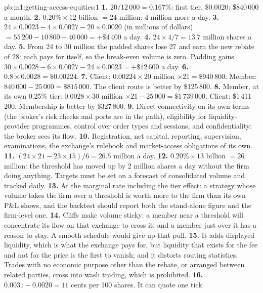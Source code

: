 \begin{solution}{pb:m1:getting-access-equities:1}
\textbf{1.} $20/12\,000 = 0.167\%$: first tier, \$0.0020: \$840\,000 a month.
\textbf{2.} $0.20\% \times 12$ billion $= 24$ million: 4 million more a day.
\textbf{3.} $24 \times 0.0023 - 4 \times 0.0027 - 20 \times 0.0020$ (in millions of
dollars) $= 55\,200 - 10\,800 - 40\,000 = +\$4\,400$ a day.
\textbf{4.} $24 \times 4/7 = 13.7$ million shares a day.
\textbf{5.} From 24 to 30 million the padded shares lose 27 and earn the new
rebate of 28: each pays for itself, so the break-even volume is zero.
Padding gains $30 \times 0.0028 - 6 \times 0.0027 - 24 \times 0.0023 = +\$12\,600$ a
day.
\textbf{6.} $0.8 \times 0.0028 = \$0.00224$.
\textbf{7.} Client: $0.00224 \times 20$ million $\times 21 = \$940\,800$. Member:
$840\,000 - 25\,000 = \$815\,000$. The client route is better by \$125\,800.
\textbf{8.} Member, at its own 0.25\% tier: $0.0028 \times 30$ million $\times 21 -
25\,000 = \$1\,739\,000$. Client: \$1\,411\,200. Membership is better by
\$327\,800.
\textbf{9.} Direct connectivity on its own terms (the broker's risk checks
and ports are in the path), eligibility for liquidity-provider programmes,
control over order types and sessions, and confidentiality: the broker sees
its flow.
\textbf{10.} Registration, net capital, reporting, supervision, examinations,
the exchange's rulebook and market-access obligations of its own.
\textbf{11.} $(24 \times 21 - 23 \times 15)/6 = 26.5$ million a day.
\textbf{12.} $0.20\% \times 13$ billion $= 26$ million: the threshold has moved
up by 2 million shares a day without the firm doing anything. Targets must
be set on a forecast of consolidated volume and tracked daily.
\textbf{13.} At the marginal rate including the tier effect: a strategy whose
volume takes the firm over a threshold is worth more to the firm than its own
P\&L shows, and the backtest should report both the stand-alone figure and
the firm-level one.
\textbf{14.} Cliffs make volume sticky: a member near a threshold will
concentrate its flow on that exchange to cross it, and a member just over it
has a reason to stay. A smooth schedule would give up that pull.
\textbf{15.} It adds displayed liquidity, which is what the exchange pays
for, but liquidity that exists for the fee and not for the price is the
first to vanish; and it distorts routing statistics. Trades with no economic
purpose other than the rebate, or arranged between related parties, cross
into wash trading, which is prohibited.
\textbf{16.} $0.0031 - 0.0020 = 11$ cents per 100 shares. It can quote one tick

\end{solution}
